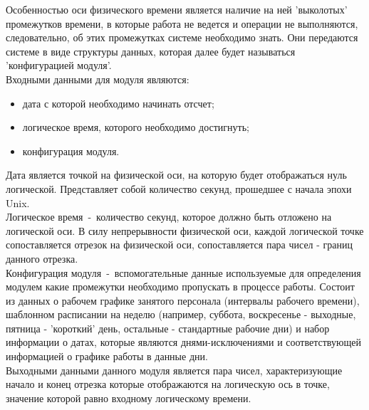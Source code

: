 Особенностью оси физического времени является наличие на ней 'выколотых' промежутков времени, в которые работа не ведется и операции не выполняются, следовательно, об этих промежутках системе необходимо знать.
Они передаются системе в виде структуры данных, которая далее будет называться 'конфигурацией модуля'.\\
\indent Входными данными для модуля являются:

\begin{itemize}
	\item дата с которой необходимо начинать отсчет;
	\item логическое время, которого необходимо достигнуть;
	\item конфигурация модуля.
\end{itemize}

\indent Дата является точкой на физической оси, на которую будет отображаться нуль логической. Представляет собой количество секунд, прошедшее с начала эпохи Unix.\\
\indent Логическое время~-~количество секунд, которое должно быть отложено на логической оси. В силу непрерывности физической оси, каждой логической точке сопоставляется отрезок на физической оси, сопоставляется пара чисел - границ данного отрезка.\\
\indent Конфигурация модуля~-~вспомогательные данные используемые для определения модулем какие промежутки необходимо пропускать в процессе работы.
Состоит из данных о рабочем графике занятого персонала (интервалы рабочего времени), шаблонном расписании на неделю (например, суббота, воскресенье - выходные, пятница - 'короткий' день, остальные - стандартные рабочие дни) и набор информации о датах, которые являются днями-исключениями и соответствующей информацией о графике работы в данные дни.\\
\indent Выходными данными данного модуля является пара чисел, характеризующие начало и конец отрезка которые отображаются на логическую ось в точке, значение которой равно входному логическому времени.\\

